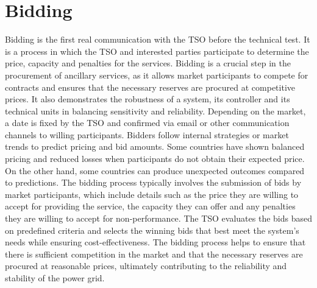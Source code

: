 \section{Bidding}
Bidding is the first real communication with the TSO before the technical test. It is a process in which the TSO and interested parties participate to determine the price, capacity and penalties for the services. Bidding is a crucial step in the procurement of ancillary services, as it allows market participants to compete for contracts and ensures that the necessary reserves are procured at competitive prices. It also demonstrates the robustness of a system, its controller and its technical units in balancing sensitivity and reliability. Depending on the market, a date is fixed by the TSO and confirmed via email or other communication channels to willing participants. Bidders follow internal strategies or market trends to predict pricing and bid amounts. Some countries have shown balanced pricing and reduced losses when participants do not obtain their expected price. On the other hand, some countries can produce unexpected outcomes compared to predictions. The bidding process typically involves the submission of bids by market participants, which include details such as the price they are willing to accept for providing the service, the capacity they can offer and any penalties they are willing to accept for non-performance. The TSO evaluates the bids based on predefined criteria and selects the winning bids that best meet the system's needs while ensuring cost-effectiveness. The bidding process helps to ensure that there is sufficient competition in the market and that the necessary reserves are procured at reasonable prices, ultimately contributing to the reliability and stability of the power grid.

\clearpage
